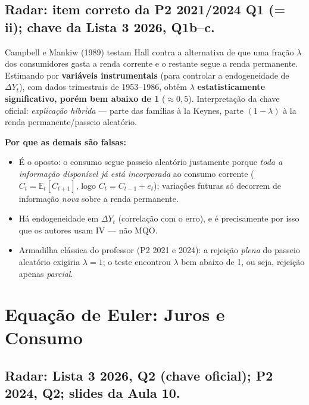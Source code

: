 \documentclass[12pt, a4paper]{article}
\newcommand{\E}{\mathbb{E}}
\begin{document}
\subsection{Radar: item correto da P2 2021/2024 Q1 (= ii); chave da Lista 3 2026, Q1b--c.}

\begin{correctbox}[title={Resposta correta: b)}]
Campbell e Mankiw (1989) testam Hall contra a alternativa de que uma fração
$\lambda$ dos consumidores gasta a renda corrente e o restante segue a renda
permanente. Estimando por \textbf{variáveis instrumentais} (para controlar a
endogeneidade de $\Delta Y_t$), com dados trimestrais de 1953--1986, obtêm
$\lambda$ \textbf{estatisticamente significativo, porém bem abaixo de 1}
($\approx 0{,}5$). Interpretação da chave oficial: \emph{explicação híbrida}
--- parte das famílias à la Keynes, parte $(1-\lambda)$ à la renda
permanente/passeio aleatório. \checkmark

\textbf{Por que as demais são falsas:}
\begin{itemize}[leftmargin=*]
\item[a)] É o oposto: o consumo segue passeio aleatório justamente porque
\emph{toda a informação disponível já está incorporada} ao consumo corrente
($C_t = \E_t[C_{t+1}]$, logo $C_t = C_{t-1} + e_t$); variações futuras só
decorrem de informação \emph{nova} sobre a renda permanente.
\item[c)] Há endogeneidade em $\Delta Y_t$ (correlação com o erro), e é
precisamente por isso que os autores usam IV --- não MQO.
\item[d)] Armadilha clássica do professor (P2 2021 e 2024): a rejeição
\emph{plena} do passeio aleatório exigiria $\lambda = 1$; o teste encontrou
$\lambda$ bem abaixo de 1, ou seja, rejeição apenas \emph{parcial}.
\end{itemize}
\end{correctbox}

\section{Equação de Euler: Juros e Consumo}

\subsection{Radar: Lista 3 2026, Q2 (chave oficial); P2 2024, Q2; slides da Aula 10.}
\end{document}
